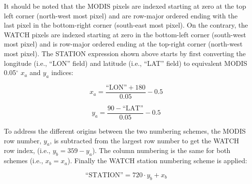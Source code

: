 \noindent It should be noted that the MODIS pixels are indexed starting at zero at the top left corner (north-west most pixel) and are row-major ordered ending with the last pixel in the bottom-right corner (south-east most pixel).  
On the contrary, the WATCH pixels are indexed starting at zero in the bottom-left corner (south-west most pixel) and is row-major ordered ending at the top-right corner (north-west most pixel).  
The STATION expression shown above starts by first converting the longitude (i.e., ``LON'' field) and latitude (i.e., ``LAT'' field) to equivalent MODIS 0.05$^{\circ}$ $x_{a}$ and $y_{a}$ indices:

\begin{equation}
\label{eq:modisxa}
    x_{a} = \frac{\text{``LON''} + 180}{0.05} - 0.5
\end{equation}

\begin{equation}
\label{eq:modisya}
    y_{a} = \frac{90 - \text{``LAT''}}{0.05} - 0.5
\end{equation}

To address the different origins between the two numbering schemes, the MODIS row number, $y_{a}$, is subtracted from the largest row number to get the WATCH row index, (i.e., $y_{b} = 359 - y_{a}$).  
The column numbering is the same for both schemes (i.e., $x_{b} = x_{a}$). 
Finally the WATCH station numbering scheme is applied:

\begin{equation}
\label{eq:modis2watch}
    \text{``STATION''} = 720 \cdot y_{b} + x_{b}
\end{equation}

